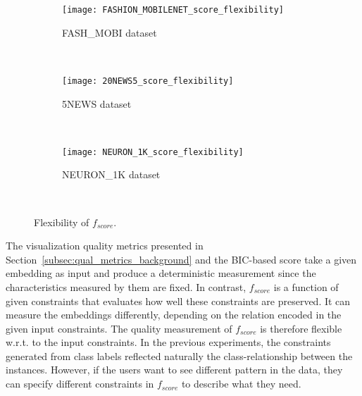 \begin{figure}%
    \centering
    \begin{subfigure}[b]{.32\linewidth}
        \texttt{[image: FASHION\_MOBILENET\_score\_flexibility]}
        \caption{{FASH\_MOBI} dataset}
        \label{fig:flexibility:FASHMOBI}
    \end{subfigure}
    ~
    \begin{subfigure}[b]{.32\linewidth}
        \texttt{[image: 20NEWS5\_score\_flexibility]}
        \caption{5NEWS dataset}
        \label{fig:flexibility:5NEWS}
    \end{subfigure}
    ~
    \begin{subfigure}[b]{.32\linewidth}
        \texttt{[image: NEURON\_1K\_score\_flexibility]}
        \caption{{NEURON\_1K} dataset}
        \label{fig:flexibility:NEURON1K}
    \end{subfigure}
    ~
    \caption{Flexibility of $f_{score}$.}
    \label{fig:flexibility}
\end{figure}

The visualization quality metrics presented in Section~\ref{subsec:qual_metrics_background} and the BIC-based score take a given embedding as input and produce a deterministic measurement since the characteristics measured by them are fixed.
In contrast, $f_{score}$ is a function of given constraints that evaluates how well these constraints are preserved.
It can measure the embeddings differently, depending on the relation encoded in the given input constraints. The quality measurement of $f_{score}$ is therefore flexible w.r.t. to the input constraints. %
In the previous experiments, the constraints generated from class labels reflected naturally the class-relationship between the instances.
However, if the users want to see different pattern in the data, they can specify different constraints in $f_{score}$ to describe what they need.

